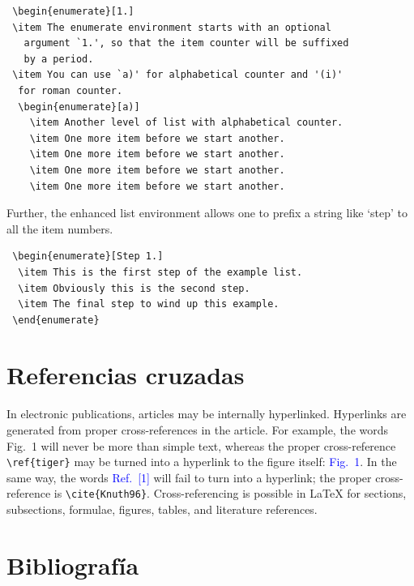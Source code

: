 \documentclass[a4paper,fleqn]{cas-dc}
\begin{document}
\begin{verbatim}
 \begin{enumerate}[1.]
 \item The enumerate environment starts with an optional
   argument `1.', so that the item counter will be suffixed
   by a period.
 \item You can use `a)' for alphabetical counter and '(i)' 
  for roman counter.
  \begin{enumerate}[a)]
    \item Another level of list with alphabetical counter.
    \item One more item before we start another.
    \item One more item before we start another.
    \item One more item before we start another.
    \item One more item before we start another.
\end{verbatim}

Further, the enhanced list environment allows one to prefix a
string like `step' to all the item numbers.  

\begin{verbatim}
 \begin{enumerate}[Step 1.]
  \item This is the first step of the example list.
  \item Obviously this is the second step.
  \item The final step to wind up this example.
 \end{enumerate}
\end{verbatim}

\section{Referencias cruzadas}
In electronic publications, articles may be internally
hyperlinked. Hyperlinks are generated from proper
cross-references in the article.  For example, the words
\textcolor{black!80}{Fig.~1} will never be more than simple text,
whereas the proper cross-reference \verb+\ref{tiger}+ may be
turned into a hyperlink to the figure itself:
\textcolor{blue}{Fig.~1}.  In the same way,
the words \textcolor{blue}{Ref.~[1]} will fail to turn into a
hyperlink; the proper cross-reference is \verb+\cite{Knuth96}+.
Cross-referencing is possible in \LaTeX{} for sections,
subsections, formulae, figures, tables, and literature
references.

\section{Bibliografía}
\end{document}

